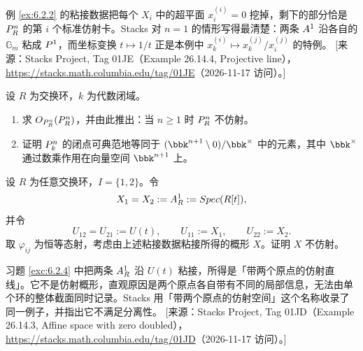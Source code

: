 \begin{yizhu}
例 \ref{ex:6.2.2} 的粘接数据把每个 $X_i$ 中的超平面 $x_i^{(i)}=0$ 挖掉，剩下的部分恰是 $P^n_R$ 的第 $i$ 个标准仿射卡。Stacks 对 $n=1$ 的情形写得最清楚：两条 $A^1$ 沿各自的 $\mathbb{G}_m$ 粘成 $P^1$，而坐标变换 $t\mapsto 1/t$ 正是本例中 $x_k^{(i)}\mapsto x_k^{(j)}/x_i^{(j)}$ 的特例。
[来源：Stacks Project, Tag 01JE（Example 26.14.4, Projective line），\url{https://stacks.math.columbia.edu/tag/01JE}（2026-11-17 访问）。]
\end{yizhu}

\begin{exercise}\label{exc:6.2.3}
设 $R$ 为交换环，$k$ 为代数闭域。
\begin{enumerate}[label=(\arabic*),leftmargin=2em,itemsep=0.25ex]
  \item 求 $O_{P^n_R}(P^n_R)$，并由此推出：当 $n\ge 1$ 时 $P^n_R$ 不仿射。
  \item 证明 $P^n_k$ 的闭点可典范地等同于 $(\bbk^{n+1}\setminus 0)/\bbk^{\times}$ 中的元素，其中 $\bbk^{\times}$ 通过数乘作用在向量空间 $\bbk^{n+1}$ 上。
\end{enumerate}
\end{exercise}

\begin{exercise}\label{exc:6.2.4}
设 $R$ 为任意交换环，$I=\{1,2\}$。令
\[
X_1=X_2:=A^1_R:=Spec(R[t]),
\]
并令
\[
U_{12}=U_{21}:=U(t),\qquad U_{11}:=X_1,\qquad U_{22}:=X_2 .
\]
取 $\varphi_{ij}$ 为恒等态射，考虑由上述粘接数据粘接所得的概形 $X$。证明 $X$ 不仿射。
\end{exercise}

\begin{yizhu}
习题 \ref{exc:6.2.4} 中把两条 $A^1_R$ 沿 $U(t)$ 粘接，所得是「带两个原点的仿射直线」。它不是仿射概形，直观原因是两个原点各自带有不同的局部信息，无法由单个环的整体截面同时记录。Stacks 用「带两个原点的仿射空间」这个名称收录了同一例子，并指出它不满足分离性。
[来源：Stacks Project, Tag 01JD（Example 26.14.3, Affine space with zero doubled），\url{https://stacks.math.columbia.edu/tag/01JD}（2026-11-17 访问）。]
\end{yizhu}


